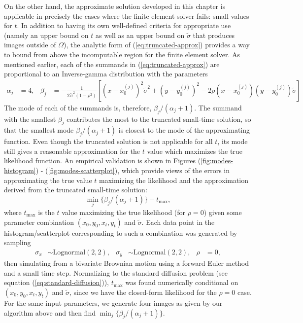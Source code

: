 \documentclass[10pt]{article}
\begin{document}
On the other hand, the approximate solution developed in this chapter
is applicable in precisely the cases where the finite element solver
fails: small values for $t$. In addition to having its own
well-defined criteria for appropriate use (namely an upper bound on
$t$ as well as an upper bound on $\tilde{\sigma}$ that produces images
outside of $\Omega$), the analytic form of (\ref{eq:truncated-approx})
provides a way to bound from above the incomputable region for the
finite element solver. As mentioned earlier, each of the summands in
(\ref{eq:truncated-approx}) are proportional to an Inverse-gamma
distribution with the parameters
\begin{align*}
  \alpha_j &= 4,& \beta_j &= -\frac{1}{2\, \tilde{\sigma}^2 (1-\rho^2)} \left[
                        \left(x-x_0^{(j)}\right)^2 \tilde{\sigma}^2 +
                        \left(y-y_0^{(j)}\right)^2 -
                        2\rho(x-x_0^{(j)})(y-y_0^{(j)})\tilde{\sigma} \right]
\end{align*}
The mode of each of the summands is, therefore,
$\beta_j/(\alpha_j+1)$. The summand with the smallest $\beta_j$
contributes the most to the truncated small-time solution, so that the
smallest mode $\beta_j/(\alpha_j+1)$ is closest to the mode of
the approximating function. Even though the truncated solution is not
applicable for all $t$, its mode still gives a reasonable
approximation for the $t$ value which maximizes the true likelihood
function. An empirical validation is shown in Figures
(\ref{fig:modes-histogram}) - (\ref{fig:modes-scatterplot}), which
provide views of the errors in approximating the true
value $t$ maximizing the likelihood and the approximation derived from
the truncated small-time solution:
\[
  \min_{j} \{ \beta_j/(\alpha_j+1) \} - t_{\max},
\]
where $t_{\max}$ is the $t$ value maximizing the true likelihood (for
$\rho=0$) given some parameter combination $(x_0, y_0, x_t, y_t)$ and
$\tilde{\sigma}$. Each data point in the histogram/scatterplot
corresponding to such a combination was generated by sampling
\begin{align*}
  \sigma_x &\sim \mbox{Lognormal}(2, 2), & \sigma_y &\sim \mbox{Lognormal}(2, 2), & \rho &= 0,
\end{align*}
then simulating from a bivariate Brownian motion using a forward Euler
method and a small time step. Normalizing to the standard diffusion
problem (see equation (\ref{eq:standard-diffusion})), $t_{\max}$ was
found numerically conditional on $(x_0, y_0, x_t, y_t)$ and
$\tilde{\sigma}$, since we have the closed-form likelihood for the
$\rho=0$ case. For the same input parameters, we generate four images
as given by our algorithm above and then find
$\min_{j} \{ \beta_j/(\alpha_j+1) \}$.
\end{document}
